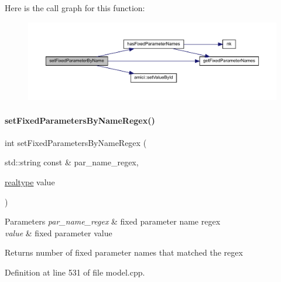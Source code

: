 Here is the call graph for this function\+:
\nopagebreak
\begin{figure}[H]
\begin{center}
\leavevmode
\includegraphics[width=350pt]{classamici_1_1_model_af1225439bd6deceb98b224e75a960800_cgraph}
\end{center}
\end{figure}
\mbox{\label{classamici_1_1_model_a4802f7d56264e3b592c167da8166cb73}} 
\paragraph{\texorpdfstring{set\+Fixed\+Parameters\+By\+Name\+Regex()}{setFixedParametersByNameRegex()}}
{\footnotesize\ttfamily int set\+Fixed\+Parameters\+By\+Name\+Regex (\begin{DoxyParamCaption}\item[{std\+::string const \&}]{par\+\_\+name\+\_\+regex,  }\item[{\mbox{\hyperlink{namespaceamici_a1bdce28051d6a53868f7ccbf5f2c14a3}{realtype}}}]{value }\end{DoxyParamCaption})}


\begin{DoxyParams}{Parameters}
{\em par\+\_\+name\+\_\+regex} & fixed parameter name regex \\
\hline
{\em value} & fixed parameter value \\
\hline
\end{DoxyParams}
\begin{DoxyReturn}{Returns}
number of fixed parameter names that matched the regex 
\end{DoxyReturn}


Definition at line 531 of file model.\+cpp.

